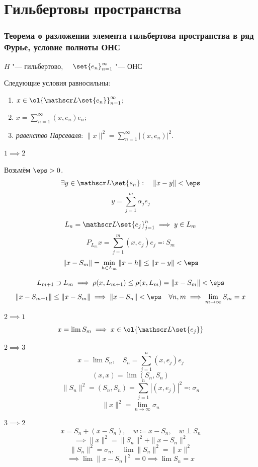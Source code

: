 \setcounter{section}{34}

\part{Гильбертовы пространства}

\section{Теорема о разложении элемента гильбертова пространства в ряд Фурье, условие
полноты ОНС}

\begin{theorem}
	$ H $ "--- гильбертово, $ \quad \set{e_n}_{n = 1}^\infty $ "--- ОНС

	Следующие условия равносильны:
	\begin{enumerate}
		\item $ x \in \ol{\mathscr L \set{e_n}}_{n = 1}^\infty $;
		\item $ x = \sum_{n = 1}^\infty (x, e_n)e_n $;
		\item \emph{равенство Парсеваля}: $ \|x\|^2 = \sum_{n = 1}^\infty |(x, e_n)|^2 $.
	\end{enumerate}
\end{theorem}

\begin{iproof}
\item $ 1 \implies 2 $

	Возьмём $ \eps > 0 $.
	$$ \exists y \in \mathscr L\set{e_n} : \quad \|x - y\| < \eps $$
	$$ y = \sum_{j = 1}^m \alpha_je_j $$

	$$ L_n = \mathscr L\set{e_j}_{j = 1}^n \implies y \in L_m $$
	$$ P_{L_m}x = \sum_{j = 1}^m (x, e_j) e_j \eqqcolon S_m $$
	$$ \|x - S_m\| = \min\limits_{h \in L_m}\|x - h\| \le \|x - y\| < \eps $$

	$$ L_{m + 1} \supset L_m \implies \rho(x, L_{m + 1}) \le \rho(x, L_m) = \|x - S_m\| < \eps $$
	$$ \|x - S_{m + 1}\| \le \|x - S_m\| \implies \|x - S_n\| < \eps \quad \forall n, m \implies
	\lim\limits_{m \to \infty} S_m = x $$
\item $ 2 \implies 1 $
	$$ x = \lim S_m \implies x \in \ol{\mathscr L\set{e_j}} $$
\item $ 2 \implies 3 $
	$$ x = \lim S_n, \quad S_n = \sum_{j = 1}^n (x, e_j) e_j $$
	$$ (x, x) = \lim (S_n, S_n) $$
	$$ \|S_n\|^2 = (S_n, S_n) = \sum_{j = 1}^n |(x, e_j)|^2 \eqqcolon \sigma_n $$
	$$ \|x\|^2 = \lim\limits_{n \to \infty} \sigma_n $$
\item $ 3 \implies 2 $
	$$ x = S_n + (x - S_n), \quad w \coloneq x - S_n, \quad w \perp S_n $$
	$$ \implies \|x\|^2 = \|S_n\|^2 + \|x - S_n\|^2 $$
	$$ \|S_n\|^2 = \sigma_n, \quad \lim\|S_n\|^2 = \|x\|^2 $$
	$$ \implies \lim\|x - S_n\|^2 = 0 \implies \lim S_n = x $$
\end{iproof}

